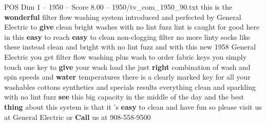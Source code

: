 \begin{textsample}{POS Dim 1 – 1950 – Score 8.00 – 1950/tv\_com\_1950\_90.txt}  \label{ex:f1_pos_015}
this is the \textbf{wonderful} filter flow washing system introduced and perfected by General Electric to \textbf{give} clean bright washes with no lint fuzz lint is caught for good here in this \textbf{easy} to reach \textbf{easy} to clean non-clogging filter no more linty socks like these instead clean and bright with no lint fuzz and with this new 1958 General Electric you get filter flow washing plus wash to order fabric keys you simply touch one key to \textbf{give} your wash load the just \textbf{right} combination of wash and spin speeds and \textbf{water} temperatures there is a clearly marked key for all your washables cottons synthetics and specials results everything clean and sparkling with no lint fuzz \textbf{see} this big capacity in the middle of the day and the best \textbf{thing} about this system is that it 's \textbf{easy} to clean and have fun so please visit us at General Electric or \textbf{Call} us at 908-558-9500

\end{textsample}
